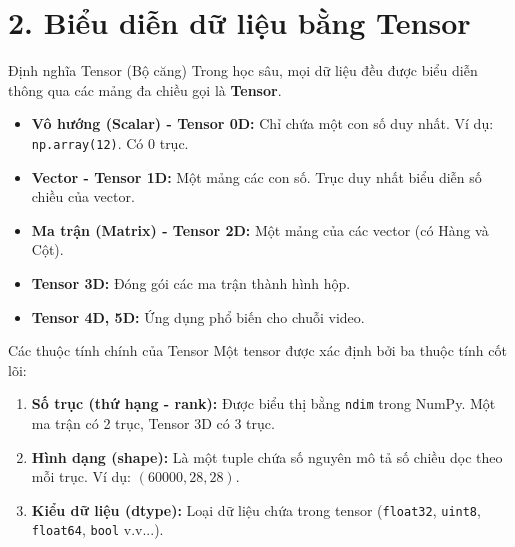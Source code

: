 \documentclass[aspectratio=169]{beamer}
\begin{document}
\section{2. Biểu diễn dữ liệu bằng Tensor}

\begin{frame}{Định nghĩa Tensor (Bộ căng)}
    Trong học sâu, mọi dữ liệu đều được biểu diễn thông qua các mảng đa chiều gọi là \textbf{Tensor}.
    \begin{itemize}
        \item \textbf{Vô hướng (Scalar) - Tensor 0D:} Chỉ chứa một con số duy nhất. Ví dụ: \texttt{np.array(12)}. Có 0 trục.
        \item \textbf{Vector - Tensor 1D:} Một mảng các con số. Trục duy nhất biểu diễn số chiều của vector.
        \item \textbf{Ma trận (Matrix) - Tensor 2D:} Một mảng của các vector (có Hàng và Cột).
        \item \textbf{Tensor 3D:} Đóng gói các ma trận thành hình hộp.
        \item \textbf{Tensor 4D, 5D:} Ứng dụng phổ biến cho chuỗi video.
    \end{itemize}
\end{frame}

\begin{frame}{Các thuộc tính chính của Tensor}
    Một tensor được xác định bởi ba thuộc tính cốt lõi:
    \begin{enumerate}
        \item \textbf{Số trục (thứ hạng - rank):} Được biểu thị bằng \texttt{ndim} trong NumPy. Một ma trận có 2 trục, Tensor 3D có 3 trục.
        \item \textbf{Hình dạng (shape):} Là một tuple chứa số nguyên mô tả số chiều dọc theo mỗi trục. Ví dụ: $(60000, 28, 28)$.
        \item \textbf{Kiểu dữ liệu (dtype):} Loại dữ liệu chứa trong tensor (\texttt{float32}, \texttt{uint8}, \texttt{float64}, \texttt{bool} v.v...).
    \end{enumerate}
\end{frame}
\end{document}
